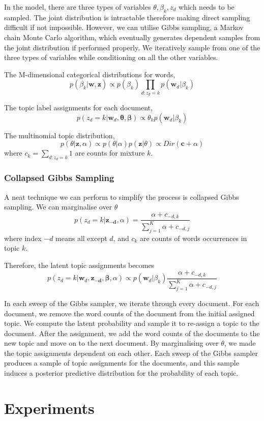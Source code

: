 \documentclass{article}
\begin{document}
In the model, there are three types of variables $\theta, \beta_k, z_d$ which needs to be sampled. The joint distribution is intractable therefore making direct sampling difficult if not impossible. However, we can utilise Gibbs sampling, a Markov chain Monte Carlo algorithm, which eventually generates dependent samples from the joint distribution if performed properly. We iteratively sample from one of the three types of variables while conditioning on all the other variables.

The M-dimensional categorical distributions for words,
$$p(\beta_k|\bm{w}, \bm{z}) \propto p(\beta_k)\prod_{d:z_d=k}p(\bm{w}_d|\beta_k)$$

The topic label assignments for each document,
$$p(z_d = k|\bm{w}_d, \bm{\theta}, \bm{\beta}) \propto \theta_k p(\bm{w}_d|\beta_{k})$$

The multinomial topic distribution,
$$p(\theta|\bm{z}, \alpha) \propto p(\theta|\alpha) p(\bm{z}|\theta) \propto Dir(\bm{c}+\alpha)$$
where $c_k = \sum_{d:z_d=k} 1$ are counts for mixture $k$.

\subsubsection{Collapsed Gibbs Sampling}
A neat technique we can perform to simplify the process is collapsed Gibbs sampling. We can marginalise over $\theta$
$$p(z_d = k | \bm{z_{-d}}, \alpha) = \dfrac{\alpha + c_{-d,k}}{\sum_{j=1}^K \alpha + c_{-d,j}}$$
where index $-d$ means all except $d$, and $c_k$ are counts of words occurrences in topic $k$.

Therefore, the latent topic assignments becomes
$$p(z_d = k | \bm{w}_d, \bm{z_{-d}}, \bm{\beta},\alpha) \propto p(\bm{w}_d | \beta_k) \dfrac{\alpha + c_{-d,k}}{\sum_{j=1}^K \alpha + c_{-d,j}}$$

In each sweep of the Gibbs sampler, we iterate through every document. For each document, we remove the word counts of the document from the initial assigned topic. We compute the latent probability and sample it to re-assign a topic to the document. After the assignment, we add the word counts of the documents to the new topic and move on to the next document. By marginalising over $\theta$, we made the topic assignments dependent on each other. Each sweep of the Gibbs sampler produces a sample of topic assignments for the documents, and this sample induces a posterior predictive distribution for the probability of each topic. 

\section{Experiments}
\end{document}
